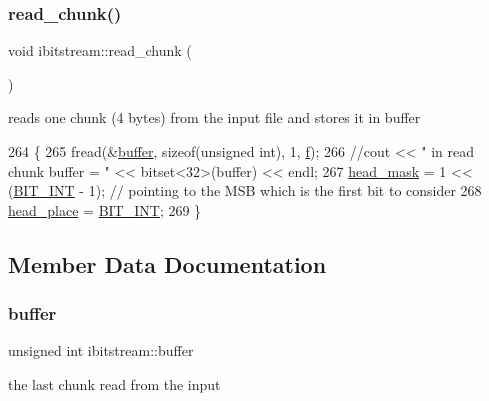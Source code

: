 \subsubsection{\texorpdfstring{read\+\_\+chunk()}{read\_chunk()}}
{\footnotesize\ttfamily void ibitstream\+::read\+\_\+chunk (\begin{DoxyParamCaption}{ }\end{DoxyParamCaption})}



reads one chunk (4 bytes) from the input file and stores it in buffer 


\begin{DoxyCode}
264                            \{
265   fread(&\hyperlink{classibitstream_a73f0b24d3d4402369f1abbb43f7f70ef}{buffer}, \textcolor{keyword}{sizeof}(\textcolor{keywordtype}{unsigned} \textcolor{keywordtype}{int}), 1, \hyperlink{classibitstream_a3ea2cdd0cf97820f0e1520c42e364308}{f});
266   \textcolor{comment}{//cout << " in read chunk  buffer = " << bitset<32>(buffer) << endl;}
267   \hyperlink{classibitstream_a48cd41991b6c29ea5120b53873a72a70}{head\_mask} = 1 << (\hyperlink{bitstream_8h_afcadf5aa65c5159bfb96c4d82ebc0a5d}{BIT\_INT} - 1); \textcolor{comment}{// pointing to the MSB which is the first bit to consider}
268   \hyperlink{classibitstream_a7b96359ac1534a5565e6e9b0cc53a0b3}{head\_place} = \hyperlink{bitstream_8h_afcadf5aa65c5159bfb96c4d82ebc0a5d}{BIT\_INT};
269 \}
\end{DoxyCode}


\subsection{Member Data Documentation}
\mbox{\label{classibitstream_a73f0b24d3d4402369f1abbb43f7f70ef}} 
\subsubsection{\texorpdfstring{buffer}{buffer}}
{\footnotesize\ttfamily unsigned int ibitstream\+::buffer\hspace{0.3cm}{\ttfamily [private]}}



the last chunk read from the input 

\mbox{\label{classibitstream_a3ea2cdd0cf97820f0e1520c42e364308}} 
